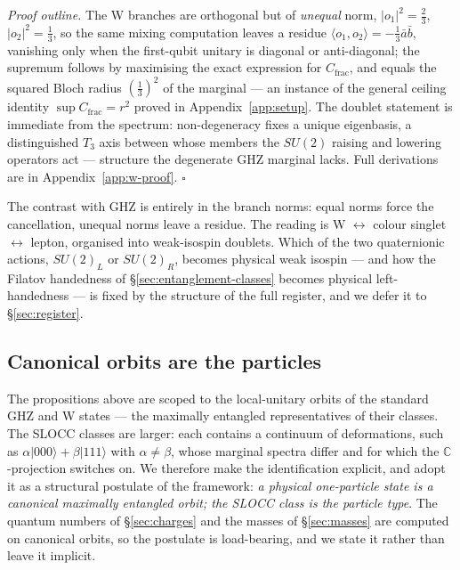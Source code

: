 \emph{Proof outline.} The W branches are orthogonal but of \emph{unequal} norm,
$\lvert o_1\rvert^2 = \tfrac23$, $\lvert o_2\rvert^2 = \tfrac13$, so the same mixing computation
leaves a residue $\langle o_1,o_2\rangle = -\tfrac13\bar a\bar b$, vanishing only when the
first-qubit unitary is diagonal or anti-diagonal; the supremum follows by maximising the exact
expression for $C_{\mathrm{frac}}$, and equals the squared Bloch radius $(\tfrac13)^2$ of the
marginal --- an instance of the general ceiling identity $\sup C_{\mathrm{frac}} = r^2$ proved in
Appendix~\ref{app:setup}. The doublet statement is immediate from the spectrum:
non-degeneracy fixes a unique eigenbasis, a distinguished $T_3$ axis between whose members the
$SU(2)$ raising and lowering operators act --- structure the degenerate GHZ marginal lacks. Full
derivations are in Appendix~\ref{app:w-proof}. \hfill$\square$

The contrast with GHZ is entirely in the branch norms: equal norms force the cancellation, unequal
norms leave a residue. The reading is W $\leftrightarrow$ colour singlet $\leftrightarrow$ lepton,
organised into weak-isospin doublets. Which of the two quaternionic actions, $SU(2)_L$ or $SU(2)_R$,
becomes physical weak isospin --- and how the Filatov handedness of \S\ref{sec:entanglement-classes}
becomes physical left-handedness --- is fixed by the structure of the full register, and we defer it
to \S\ref{sec:register}.

\subsection{Canonical orbits are the particles}
\label{sec:canonical-orbits}

The propositions above are scoped to the local-unitary orbits of the standard GHZ and W states ---
the maximally entangled representatives of their classes. The SLOCC classes are larger: each contains
a continuum of deformations, such as $\alpha\lvert000\rangle+\beta\lvert111\rangle$ with
$\alpha\neq\beta$, whose marginal spectra differ and for which the $\mathbb{C}$-projection switches
on. We therefore make the identification explicit, and adopt it as a structural postulate of the
framework: \emph{a physical one-particle state is a canonical maximally entangled orbit; the SLOCC
class is the particle type}. The quantum numbers of \S\ref{sec:charges} and the masses of
\S\ref{sec:masses} are computed on canonical orbits, so the postulate is load-bearing, and we state
it rather than leave it implicit.

